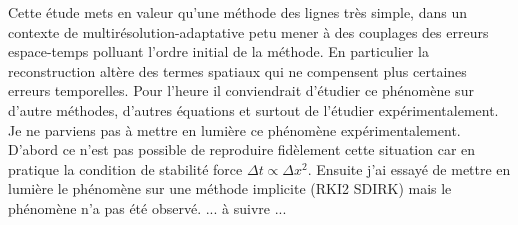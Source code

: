 Cette étude mets en valeur qu'une méthode des lignes très simple, dans un contexte de multirésolution-adaptative
petu mener à des couplages des erreurs espace-temps polluant l'ordre initial de la méthode.
En particulier la reconstruction altère des termes spatiaux qui ne compensent plus certaines erreurs temporelles. 
Pour l'heure il conviendrait d'étudier ce phénomène sur d'autre méthodes, d'autres équations et surtout de l'étudier expérimentalement.
Je ne parviens pas à mettre en lumière ce phénomène expérimentalement. 
D'abord ce n'est pas possible de reproduire fidèlement cette situation car en pratique la condition de stabilité force $\Delta t \propto \Delta x^2$. 
Ensuite j'ai essayé de mettre en lumière le phénomène sur une méthode implicite (RKI2 SDIRK) mais le phénomène n'a pas été observé. 
...     à suivre    ... 